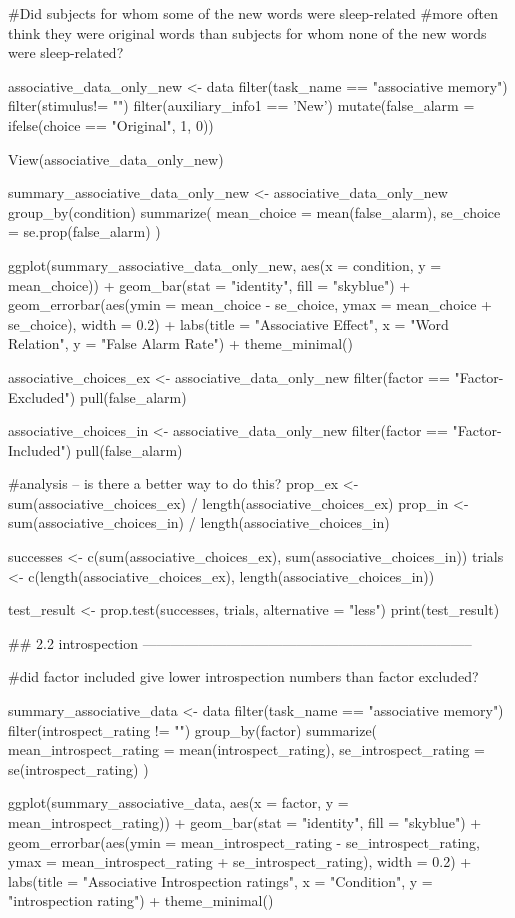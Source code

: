 \documentclass{article}
\begin{document}
#Did subjects for whom some of the new words were sleep-related 
#more often think they were original words than subjects for whom none of the new words were sleep-related? 

associative_data_only_new <- data %
  filter(task_name == "associative memory") %
  filter(stimulus!= "") %
  filter(auxiliary_info1 == 'New') %
  mutate(false_alarm = ifelse(choice == "Original", 1, 0))

View(associative_data_only_new)

summary_associative_data_only_new <- associative_data_only_new %
  group_by(condition) %
  summarize(
    mean_choice = mean(false_alarm),
    se_choice = se.prop(false_alarm)
  )

ggplot(summary_associative_data_only_new, aes(x = condition, y = mean_choice)) +
  geom_bar(stat = "identity", fill = "skyblue") +
  geom_errorbar(aes(ymin = mean_choice - se_choice, ymax = mean_choice + se_choice), width = 0.2) +
  labs(title = "Associative Effect", x = "Word Relation", y = "False Alarm Rate") +
  theme_minimal()

associative_choices_ex <- associative_data_only_new %
  filter(factor == "Factor-Excluded") %
  pull(false_alarm)

associative_choices_in <- associative_data_only_new %
  filter(factor == "Factor-Included") %
  pull(false_alarm)

#analysis -- is there a better way to do this?
prop_ex <- sum(associative_choices_ex) / length(associative_choices_ex)
prop_in <- sum(associative_choices_in) / length(associative_choices_in)

successes <- c(sum(associative_choices_ex), sum(associative_choices_in))
trials <- c(length(associative_choices_ex), length(associative_choices_in))

test_result <- prop.test(successes, trials, alternative = "less")
print(test_result)


    ## 2.2 introspection -----------------------------------------------------------------------

#did factor included give lower introspection numbers than factor excluded?

summary_associative_data <- data %
  filter(task_name == "associative memory") %
  filter(introspect_rating != "") %
  group_by(factor) %
  summarize(
    mean_introspect_rating = mean(introspect_rating),
    se_introspect_rating = se(introspect_rating)
  )

ggplot(summary_associative_data, aes(x = factor, y = mean_introspect_rating)) +
  geom_bar(stat = "identity", fill = "skyblue") +
  geom_errorbar(aes(ymin = mean_introspect_rating - se_introspect_rating, ymax = mean_introspect_rating + se_introspect_rating), width = 0.2) +
  labs(title = "Associative Introspection ratings", x = "Condition", y = "introspection rating") +
  theme_minimal()
\end{document}
